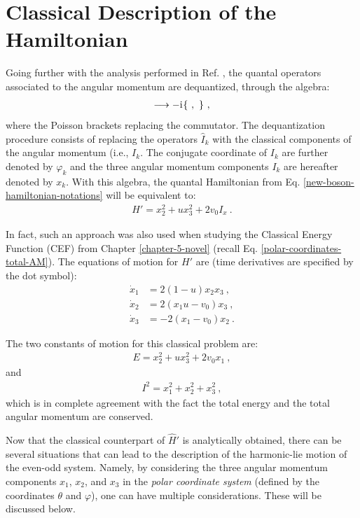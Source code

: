 \section{Classical Description of the Hamiltonian}
\label{classical-description-new-boson-section}

Going further with the analysis performed in Ref. \cite{raduta2020new}, the quantal operators associated to the angular momentum are dequantized, through the algebra:
\begin{align}
    [\ ,\ ] \longrightarrow -\iu\{\ ,\ \}\ ,
\end{align}
where the Poisson brackets replacing the commutator. The dequantization procedure consists of replacing the operators $\hat{I}_k$ with the classical components of the angular momentum (i.e., $I_k$. The conjugate coordinate of $I_k$ are further denoted by $\varphi_k$ and the three angular momentum components $I_k$ are hereafter denoted by $x_k$. With this algebra, the quantal Hamiltonian from Eq. \ref{new-boson-hamiltonian-notations} will be equivalent to:
\begin{align}
    H'=x_2^2+ux_3^2+2v_0I_x\ .
    \label{new-boson-h-prime-classical}
\end{align}

In fact, such an approach was also used when studying the Classical Energy Function (CEF) from Chapter \ref{chapter-5-novel} (recall Eq. \ref{polar-coordinates-total-AM}). The equations of motion for $H'$ are (time derivatives are specified by the dot symbol):
\begin{align}
    \dot{x}_1&=2(1-u)x_2x_3\ ,\nonumber\\
    \dot{x}_2&=2(x_1u-v_0)x_3\ ,\nonumber\\
    \dot{x}_3&=-2(x_1-v_0)x_2\ .
\end{align}

The two constants of motion for this classical problem are:
\begin{align}
    E=x_2^2+ux_3^2+2v_0x_1\ ,
\end{align}
and 
\begin{align}
    I^2=x_1^2+x_2^2+x_3^2\ ,
\end{align}
which is in complete agreement with the fact the total energy and the total angular momentum are conserved.

Now that the classical counterpart of $\hat{H}'$ is analytically obtained, there can be several situations that can lead to the description of the harmonic-lie motion of the even-odd system. Namely, by considering the three angular momentum components $x_1$, $x_2$, and $x_3$ in the \emph{polar coordinate system} (defined by the coordinates $\theta$ and $\varphi$), one can have multiple considerations. These will be discussed below.

